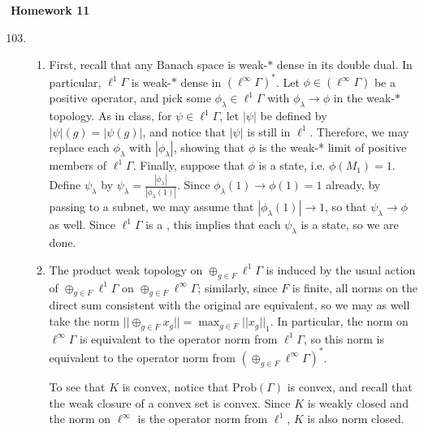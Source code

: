 \documentclass[a4paper,10pt]{report}
\newcommand{\pn}[2]{||#1||_{#2}}
\newcommand{\norm}[1]{||#1||}
\begin{document}

\pagestyle{fancy}	
\fancyhf{} %
\setlength{\headheight}{60pt}

\begin{center}
	\textbf{Homework 11}
\end{center}
\begin{enumerate}
		\setcounter{enumi}{102}
	\item
		\begin{enumerate}
			\item First, recall that any Banach space is weak-$*$ dense in its double dual. In particular, $\ell^1\Gamma$ is weak-$*$ dense in $(\ell^\infty\Gamma)^*$. Let $\phi\in(\ell^\infty\Gamma)$ be a positive operator, and pick some $\phi_\lambda\in\ell^1\Gamma$ with $\phi_\lambda\to\phi$ in the weak-$*$ topology. As in class, for $\psi\in\ell^1\Gamma$, let $|\psi|$ be defined by $|\psi|(g)=|\psi(g)|$, and notice that $|\psi|$ is still in $\ell^1$. Therefore, we may replace each $\phi_\lambda$ with $|\phi_\lambda|$, showing that $\phi$ is the weak-* limit of positive members of $\ell^1\Gamma$. Finally, suppose that $\phi$ is a state, i.e. $\phi(M_1)=1$. Define $\psi_\lambda$ by $\psi_\lambda=\frac{|\phi_\lambda|}{|\phi_\lambda(1)|}$. Since $\phi_\lambda(1)\to\phi(1)=1$ already, by passing to a subnet, we may assume that $|\phi_\lambda(1)|\to 1$, so that $\psi_\lambda\to\phi$ as well. Since $\ell^1\Gamma$ is a \csa, this implies that each $\psi_\lambda$ is a state, so we are done. 
			\item The product weak topology on $\oplus_{g\in F}\ell^1\Gamma$ is induced by the usual action of $\oplus_{g\in F}\ell^1\Gamma$ on $\oplus_{g\in F}\ell^\infty\Gamma$; similarly, since $F$ is finite, all norms on the direct sum consistent with the original are equivalent, so we may as well take the norm $\norm{\oplus_{g\in F}x_g}=\max_{g\in F}\pn{x_g}{1}$. In particular, the norm on $\ell^\infty\Gamma$ is equivalent to the operator norm from $\ell^1\Gamma$, so this norm is equivalent to the operator norm from $(\oplus_{g\in F}\ell^\infty\Gamma)^*$. 
				
				To see that $K$ is convex, notice that $\text{Prob}(\Gamma)$ is convex, and recall that the weak closure of a convex set is convex. Since $K$ is weakly closed and the norm on $\ell^\infty$ is the operator norm from $\ell^1$, $K$ is also norm closed. 
				

\end{enumerate}
\end{enumerate}
\end{document}
